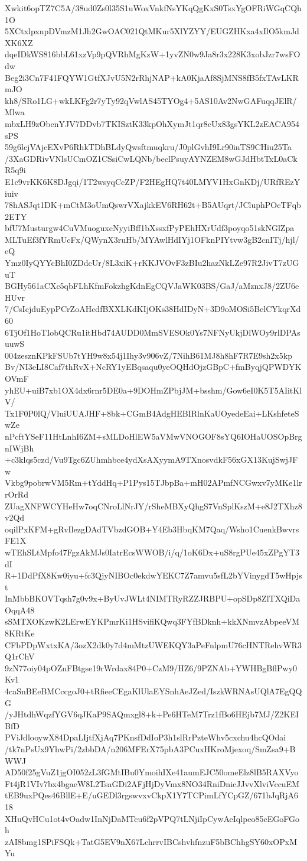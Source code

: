 Xwkit6opTZ7C5A/38ud0Zs0l35S1uWoxVnkfNsYKqQgKxS0TsxYgOFRiWGqCQh1O
5XCtxlpxnpDVmzM1Jh2GwOAC021QtMKur5XlYZYY/EUGZHKxa4xIlO5kmJdXK6XZ
dqeIDkWS816bbL61xzVp9pQVRhMgKzW+1yvZN0w9Ja8r3x228K3xobJzr7wsFOdw
Beg2i3Cn7F41FQYW1GtfXJvU5N2rRhjNAP+kA0KjaAf8SjMNS8fB5fxTAvLKRmJO
kh8/SRo1LG+wkLKFg2r7yTy92qVwlAS45TYOg4+5AS10Av2NwGAFuqqJElR/Mlwa
mbxLH9zObenYJV7DDvb7TKISztK33kpOhXymJt1qr8cUx83gsYKL2zEACA954sPS
59g6lcjVAjcEXvP6RhkTDhBLdyQwsftmuqkru/J0plGvhI9Lr90inTS9CHiu25Ta
/3XaGDRivVNlsUCmOZ1CSsiCwLQNb/beclPsuyAYNZEM8wGJdHbtTxL0aCkR5q9i
E1c9vrKK6K8DJgqi/1T2wsyqCcZP/F2HEgHQ7t40LMYV1HxGnKDj/URfREzYiuiv
78hASJqt1DK+mCtM3oUmQswrVXajkkEV6RH62t+B5AUqrt/JCluphPOcTFqb2ETY
bfU7Musturgw4CuVMuoguxcNyyiBff1bXssxfPyPEhHXrUdf3poyqo51skNGlZpa
MLTuEf3fYRmUcFx/QWynX3ruHb/MYAwlHdIYj1OFknPIYtvw3gB2cnITj/hjl/eQ
Ymz0IyQYYcBhI0ZDdcUr/8L3xiK+rKKJVOvF3zBIu2hazNkLZe97R2JivT7zUGuT
BGHy561aCXc5qbFLhKfmFokzhgKdnEgCQVJaWK03BS/GaJ/aMznxJ8/2ZU6eHUvr
7/CsIcjduEypPCrZoAHcdfBXXLKdKIjOKs38HdIDyN+3D9oMOSi5BelCYkqrXd60
6TjOf1HoTIobQCRu1itHbd74AUDD0MmSVESOk0Ys7NFNyUkjDlWOy9rlDPAsuuwS
004zesznKPkFSUb7tYH9w8x54j1Ihy3v906vZ/7NihB61MJ8h8hF7R7E9sh2x5kp
Bv/NI3eLI8Caf7thRvX+NcRY1yEBqsaqu0yeOQHdOjzGBpC+fmByqjQPWDYKOVmF
yhEU+uiB7xb1OX4dx6rnr5DE0a+9DOHmZPbjJM+bsshm/Gow6eI0K5T5AIitKlV/
Tx1F0P0lQ/VluiUUAJHF+8bk+CGmB4AdgHEBIRlnKaUOyedeEai+LKshfeteSwZe
nPcftYSeF11HtLnhI6ZM+sMLDoHlEW5aVMwVNOGOF8sYQ6IOHaUOSOpBrgnIWjBh
+c3klqs5czd/Vu9Tgc6ZUhmhbce4ydXsAXyymA9TXnosvdkF56xGX13KujSwjJFw
Vkbg9pobrwVM5Rm+tYddHq+P1Pys15TJbpBa+mH02APmfNCGwxv7yMKe1lrrOrRd
ZUagXNFWCYHeHw7oqCNroLlNrJY/rSheMBXyQhgS7VnSplKszM+e8J2TXhz8v2Qd
oqilPxKFM+gRvIlezgDAdTVbzdGOB+Y4Eb3HbqKM7Qaq/Wsho1CuenkBwvrsFE1X
wTEhSLtMpfo47FgzAkMJs0IatrEcsWWOB/i/q/1oK6Dx+uS8rgPUe45xZPgYT3dI
R+1DdPfX8Kw0iyu+fc3QjyNIBOc0ekdwYEKC7Z7amvu5sfL2bYVinygdT5wHpjst
InMbbBKOVTqsh7g0v9x+ByUvJWLt4NIMTRyRZZJRBPU+opSDp8ZlTXQiDaOqqA48
sSMTXOKzwK2LErwEYKPmrKi1HSvifiKQwq3FYfBDknh+kkXNmvzAbpeeVM8KRtKe
CFbPDpWxtxKA/3ozX2dk0y7d4mMtzUWEKQY3aPeFnlpmU76cHNTRehvWR3Q1rChV
9zN77oiy04pOZnFBtgse19rWrdax84P0+CzM9/HZ6/9PZNAb+YWHBgBflPwy0Kv1
4caSnBEeBMCccgoJ0+tRfieeCEgaKlUlaEYSnhAeJZed/IszkWRNAsUQlA7EgQQG
/yJHtdhWqzfYGV6qJKaP9SAQmxgl8+k+Pe6HTeM7Trz1fBo6HEjb7MJ/Z2KEIBfD
PViJdlooywX84DpaLIjtfXjAq7PKnsfDdIoP3h1slRrPzteWhv5cxchu4hcQOdai
/tk7nPsUx9YhwPi/2zbbDA/n206MFErX75pbA3PCuxHKroMjexoq/SmZsa9+BWWJ
AD50f25gVuZ1jgOI052zL3fGMtIBu0YmoihIXe41aumEJC50omeElz8lB5RAXVyo
Ft4jR1VIv7bx4bgaeW8L2TsaGDi2AFjHjDyVmx8NO34RniDnicJJvvXlviVccuEM
tEB9uxPQes46BllE+E/uGEDl3rgswvxvCkpX1Y7TCPimLfYCpGZ/671bJqRjA618
XHuQvHCu1ot4vOadw1InNjDaMTcu6f2pVPQ7tLNjiIpCywAeIqlpeo85cEGoFGoh
zAI8bmg1SPiFSQk+TatG5EV9nX67LchrrvIBCshvhfnzuF5bBChhgSY60xOPxMYu
